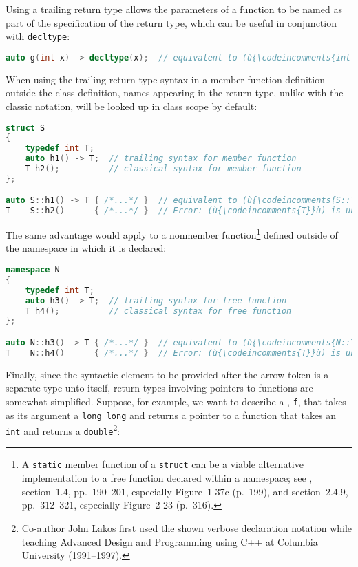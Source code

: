 \noindent Using a trailing return type allows the parameters of a function to be
named as part of the specification of the return type, which can be
useful in conjunction with \lstinline!decltype!:

\begin{lstlisting}[language=C++]
auto g(int x) -> decltype(x);  // equivalent to (ù{\codeincomments{int g(int x);}}ù)
\end{lstlisting}
    
\noindent When using the trailing-return-type syntax in a member function
definition outside the class definition, names appearing in the return
type, unlike with the classic notation, will be looked up in class scope
by default:

\begin{lstlisting}[language=C++]
struct S
{
    typedef int T;
    auto h1() -> T;  // trailing syntax for member function
    T h2();          // classical syntax for member function
};

auto S::h1() -> T { /*...*/ }  // equivalent to (ù{\codeincomments{S::T S::h1() \{ /\*...\*/ \}}}ù)
T    S::h2()      { /*...*/ }  // Error: (ù{\codeincomments{T}}ù) is unknown in this context.
\end{lstlisting}
    
\noindent The same advantage would apply to a nonmember
function{\cprotect\footnote{A \lstinline!static! member function of a
\lstinline!struct! can be a viable alternative implementation to a free
function declared within a namespace; see \cite{lakos20}, section~1.4,
pp.~190--201, especially Figure~1-37c (p.~199), and section~2.4.9, pp.~312--321, especially Figure~2-23 (p.~316).}} defined outside of the namespace in
which it is declared:

\begin{lstlisting}[language=C++]
namespace N
{
    typedef int T;
    auto h3() -> T;  // trailing syntax for free function
    T h4();          // classical syntax for free function
};

auto N::h3() -> T { /*...*/ }  // equivalent to (ù{\codeincomments{N::T N::h3() \{ /\*...\*/ \}}}ù)
T    N::h4()      { /*...*/ }  // Error: (ù{\codeincomments{T}}ù) is unknown in this context.
\end{lstlisting}
    

Finally, since the syntactic element to be provided after the arrow
token is a separate type unto itself, return types involving pointers to
functions are somewhat simplified. Suppose, for example, we want to
describe a , \lstinline!f!, that takes as its
argument a \lstinline!long!~\lstinline!long! and returns a pointer to a
function that takes an \lstinline!int! and returns a
\lstinline!double!{\cprotect\footnote{Co-author John Lakos first used the shown verbose declaration notation
while teaching Advanced Design and Programming using C++ at Columbia
  University (1991--1997).}}:

